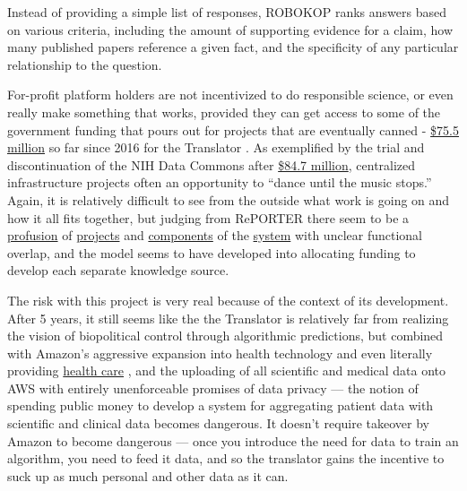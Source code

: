 \documentclass[10pt]{article}
\begin{document}
\begin{multicols}{2}
\begin{leftbar}
Instead of providing a simple list of responses, ROBOKOP ranks answers
based on various criteria, including the amount of supporting evidence
for a claim, how many published papers reference a given fact, and the
specificity of any particular relationship to the question.
\end{leftbar}

For-profit platform holders are not incentivized to do responsible
science, or even really make something that works, provided they can get
access to some of the government funding that pours out for projects
that are eventually canned -
\href{https://reporter.nih.gov/search/kDJ97zGUFEaIBIltUmyd_Q/projects?sort_field=FiscalYear\&sort_order=desc}{\$75.5
million} so far since 2016 for the Translator \cite{RePORTRePORTERBiomedical2021} . As exemplified by the trial and
discontinuation of the NIH Data Commons after
\href{https://reporter.nih.gov/search/H4LxgMGK9kGw6SeWCom85Q/projects?shared=true}{\$84.7
million}, centralized infrastructure projects often an opportunity to
``dance until the music stops.'' Again, it is relatively difficult to
see from the outside what work is going on and how it all fits together,
but judging from RePORTER there seem to be a
\href{https://reporter.nih.gov/project-details/10332268}{profusion} of
\href{https://reporter.nih.gov/project-details/10333468}{projects} and
\href{https://reporter.nih.gov/project-details/10333460}{components} of
the \href{https://reporter.nih.gov/project-details/10330627}{system}
with unclear functional overlap, and the model seems to have developed
into allocating funding to develop each separate knowledge source.

The risk with this project is very real because of the context of its
development. After 5 years, it still seems like the the Translator is
relatively far from realizing the vision of biopolitical control through
algorithmic predictions, but combined with Amazon's aggressive expansion
into health technology \cite{AWSAnnouncesAWS2021}  and even
literally providing \href{https://amazon.care/}{health care} \cite{lermanAmazonBuiltIts2021} , and the uploading of all scientific and
medical data onto AWS with entirely unenforceable promises of data
privacy \cite{quinnYouCanTrust2021}  --- the notion of spending
public money to develop a system for aggregating patient data with
scientific and clinical data becomes dangerous. It doesn't require
takeover by Amazon to become dangerous --- once you introduce the need
for data to train an algorithm, you need to feed it data, and so the
translator gains the incentive to suck up as much personal and other
data as it can.


\end{multicols}
\end{document}
